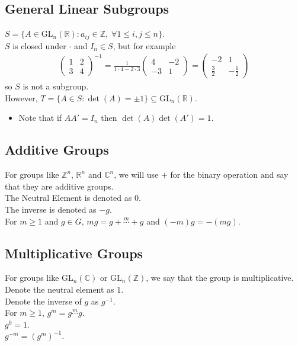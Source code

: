 \documentclass[11pt]{article}
\newcommand{\0}{\emptyset}
\newcommand{\Z}{\mathbb{Z}}
\newcommand{\R}{\mathbb{R}}
\newcommand{\C}{\mathbb{C}}
\begin{document}
\subsection*{General Linear Subgroups}
\label{sec:org5b1bbc2}
\(S=\{A\in\text{GL}_{n}(\R):a_{ij}\in\Z,\;\forall 1\leq i,j\leq n\}\).\\[0pt]
\(S\) is closed under \(\cdot\) and \(I_{n}\in S\), but for example\\[0pt]
\begin{align*}
  \begin{pmatrix}
    1 & 2 \\
    3 & 4
  \end{pmatrix}^{-1}
  = \frac{1}{1\cdot4-2\cdot3}
  \begin{pmatrix}
    4 & -2 \\
    -3 & 1
  \end{pmatrix}
  =
  \begin{pmatrix}
    -2 & 1 \\
    \frac{3}{2} & -\frac{1}{2}
  \end{pmatrix}
\end{align*}
so \(S\) is not a subgroup.\\[0pt]
However, \(T=\{A\in S:\det(A)=\pm1\} \subseteq \text{GL}_{n}(\R)\).\\[0pt]
\begin{itemize}
\item Note that if \(AA'=I_{n}\) then \(\det(A)\det(A')=1\).\\[0pt]
\end{itemize}
\subsection*{Additive Groups}
\label{sec:orge2e9ac1}
For groups like \(\Z^{n}\), \(\R^{n}\) and \(\C^{n}\), we will use \(+\) for the binary operation and say that they are additive groups.\\[0pt]
The Neutral Element is denoted as \(0\).\\[0pt]
The inverse is denoted as \(-g\).\\[0pt]
For \(m\geq 1\) and \(g\in G\), \(mg=g+\overset{m}{\cdots}+g\) and \((-m)g=-(mg)\).\\[0pt]
\subsection*{Multiplicative Groups}
\label{sec:orgc2918f1}
For groups like \(\text{GL}_{n}(\C)\) or \(\text{GL}_{n}(\Z)\), we say that the group is multiplicative.\\[0pt]
Denote the neutral element as \(1\).\\[0pt]
Denote the inverse of \(g\) as \(g^{-1}\).\\[0pt]
For \(m\geq1\), \(g^{m}=g\overset{m}{\cdots}g\).\\[0pt]
\(g^{0}=1\).\\[0pt]
\(g^{-m}=(g^{m})^{-1}\).\\[0pt]
\end{document}
